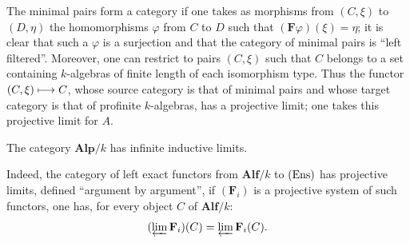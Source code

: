 The minimal pairs form a category if one takes as morphisms from $(C,\xi)$ to $(D,\eta)$ the homomorphisms $\varphi$ from $C$ to $D$ such that $(\mathbf F\varphi)(\xi)=\eta$; it is clear that such a $\varphi$ is a surjection and that the category of minimal pairs is ``left filtered''. Moreover, one can restrict to pairs $(C,\xi)$ such that $C$ belongs to a set containing $k$-algebras of finite length of each isomorphism type. Thus the functor $(C,\xi)\longmapsto C$, whose source category is that of minimal pairs and whose target category is that of profinite $k$-algebras, has a projective limit; one takes this projective limit for $A$.
\begin{corollary}{}
The category $\mathbf{Alp}/k$ has infinite inductive limits.
\end{corollary}
Indeed, the category of left exact functors from $\mathbf{Alf}/k$ to $\textup{(Ens)}$ has projective limits, defined ``argument by argument'', \ie if $(\mathbf F_i)$ is a projective system of such functors, one has, for every object $C$ of $\mathbf{Alf}/k$:
\[
(\varprojlim\mathbf F_i)(C)=\varprojlim\mathbf F_i(C).
\]

